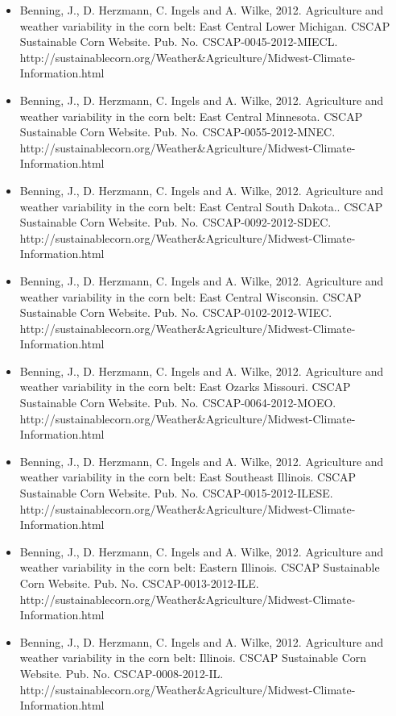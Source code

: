 \begin{itemize}
\item Benning, J., D. Herzmann, C. Ingels and A. Wilke, 2012. Agriculture and weather variability in the corn belt: East Central Lower Michigan. CSCAP Sustainable Corn Website. Pub. No. CSCAP-0045-2012-MIECL. http://sustainablecorn.org/Weather\&Agriculture/Midwest-Climate-Information.html

\item Benning, J., D. Herzmann, C. Ingels and A. Wilke, 2012. Agriculture and weather variability in the corn belt: East Central Minnesota. CSCAP Sustainable Corn Website. Pub. No. CSCAP-0055-2012-MNEC. http://sustainablecorn.org/Weather\&Agriculture/Midwest-Climate-Information.html

\item Benning, J., D. Herzmann, C. Ingels and A. Wilke, 2012. Agriculture and weather variability in the corn belt: East Central South Dakota.. CSCAP Sustainable Corn Website. Pub. No. CSCAP-0092-2012-SDEC. http://sustainablecorn.org/Weather\&Agriculture/Midwest-Climate-Information.html

\item Benning, J., D. Herzmann, C. Ingels and A. Wilke, 2012. Agriculture and weather variability in the corn belt: East Central Wisconsin. CSCAP Sustainable Corn Website. Pub. No. CSCAP-0102-2012-WIEC. http://sustainablecorn.org/Weather\&Agriculture/Midwest-Climate-Information.html

\item Benning, J., D. Herzmann, C. Ingels and A. Wilke, 2012. Agriculture and weather variability in the corn belt: East Ozarks Missouri. CSCAP Sustainable Corn Website. Pub. No. CSCAP-0064-2012-MOEO. http://sustainablecorn.org/Weather\&Agriculture/Midwest-Climate-Information.html

\item Benning, J., D. Herzmann, C. Ingels and A. Wilke, 2012. Agriculture and weather variability in the corn belt: East Southeast Illinois. CSCAP Sustainable Corn Website. Pub. No. CSCAP-0015-2012-ILESE. http://sustainablecorn.org/Weather\&Agriculture/Midwest-Climate-Information.html

\item Benning, J., D. Herzmann, C. Ingels and A. Wilke, 2012. Agriculture and weather variability in the corn belt: Eastern Illinois. CSCAP Sustainable Corn Website. Pub. No. CSCAP-0013-2012-ILE. http://sustainablecorn.org/Weather\&Agriculture/Midwest-Climate-Information.html

\item Benning, J., D. Herzmann, C. Ingels and A. Wilke, 2012. Agriculture and weather variability in the corn belt: Illinois. CSCAP Sustainable Corn Website. Pub. No. CSCAP-0008-2012-IL. http://sustainablecorn.org/Weather\&Agriculture/Midwest-Climate-Information.html


\end{itemize}
